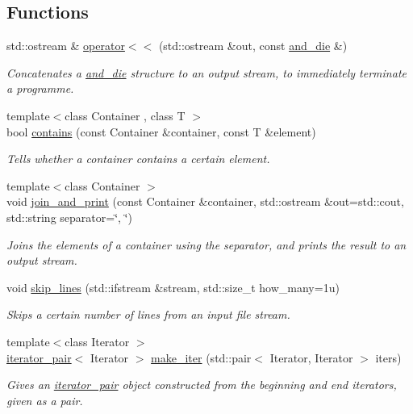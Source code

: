 \subsection*{Functions}
\begin{DoxyCompactItemize}
\item 
std\+::ostream \& \hyperlink{namespaceas_a4d891ae352512e1c506d6cd01ff1422c}{operator$<$$<$} (std\+::ostream \&out, const \hyperlink{structas_1_1and__die}{and\+\_\+die} \&)
\begin{DoxyCompactList}\small\item\em Concatenates a \hyperlink{structas_1_1and__die}{and\+\_\+die} structure to an output stream, to immediately terminate a programme. \end{DoxyCompactList}\item 
{\footnotesize template$<$class Container , class T $>$ }\\bool \hyperlink{namespaceas_a49cf7ae4239ab51e54f099d30a84811a}{contains} (const Container \&container, const T \&element)
\begin{DoxyCompactList}\small\item\em Tells whether a container contains a certain element. \end{DoxyCompactList}\item 
{\footnotesize template$<$class Container $>$ }\\void \hyperlink{namespaceas_aab6569c28591bebed9bd29b40c772bfc}{join\+\_\+and\+\_\+print} (const Container \&container, std\+::ostream \&out=std\+::cout, std\+::string separator=\char`\"{}, \char`\"{})
\begin{DoxyCompactList}\small\item\em Joins the elements of a container using the separator, and prints the result to an output stream. \end{DoxyCompactList}\item 
void \hyperlink{namespaceas_a359f2d209e5ec052ec0d2752a589802d}{skip\+\_\+lines} (std\+::ifstream \&stream, std\+::size\+\_\+t how\+\_\+many=1u)
\begin{DoxyCompactList}\small\item\em Skips a certain number of lines from an input file stream. \end{DoxyCompactList}\item 
{\footnotesize template$<$class Iterator $>$ }\\\hyperlink{classas_1_1iterator__pair}{iterator\+\_\+pair}$<$ Iterator $>$ \hyperlink{namespaceas_a4d4e0fb99b7cc564adaa85b693392070}{make\+\_\+iter} (std\+::pair$<$ Iterator, Iterator $>$ iters)
\begin{DoxyCompactList}\small\item\em Gives an \hyperlink{classas_1_1iterator__pair}{iterator\+\_\+pair} object constructed from the beginning and end iterators, given as a pair. \end{DoxyCompactList}\end{DoxyCompactItemize}


